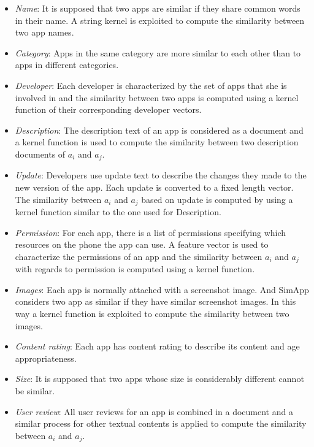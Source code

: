 \begin{itemize}
	\item \emph{Name}: It is supposed that two apps are similar if they share common words in their name. A string kernel is exploited to compute the similarity between two app names.
	\item \emph{Category}: Apps in the same category are more similar to each other than to apps in different categories.	
	\item \emph{Developer}: Each developer is characterized by the set of apps that she is involved in and the similarity between two apps is computed using a kernel function of their corresponding developer vectors. 
	\item \emph{Description}: The description text of an app is considered as a document and a kernel function is used to compute the similarity between two description documents of $a_{i}$ and $a_{j}$.
	\item \emph{Update}: Developers use update text to describe the changes they made to the new version of the app. Each update is converted to a fixed length vector. The similarity between $a_{i}$ and $a_{j}$ based on update is computed by using a kernel function similar to the one used for Description. 
	\item \emph{Permission}: For each app, there is a list of permissions specifying which resources on the phone the app can use. A feature vector is used to characterize the permissions of an app and the similarity between $a_{i}$ and $a_{j}$ with regards to permission is computed using a kernel function.      
	\item \emph{Images}: Each app is normally attached with a screenshot image. And SimApp considers two app as similar if they have similar screenshot images. In this way a kernel function is exploited to compute the similarity between two images. 
	\item \emph{Content rating}: Each app has content rating to describe its content and age appropriateness.
	\item \emph{Size}: It is supposed that two apps whose size is considerably different cannot be similar.
	\item \emph{User review}: All user reviews for an app is combined in a document and a similar process for other textual contents is applied to compute the similarity between $a_{i}$ and $a_{j}$.
\end{itemize}



